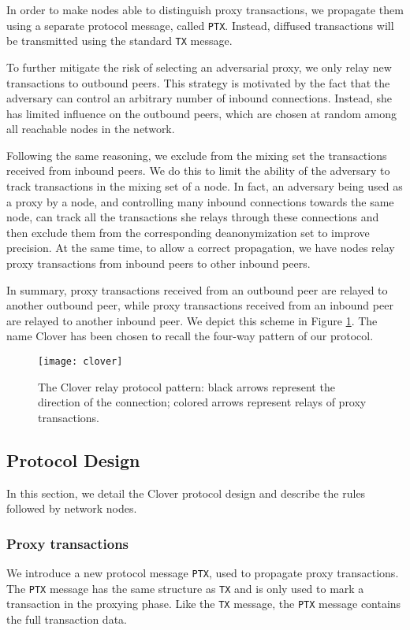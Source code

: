 \documentclass{article}
\begin{document}
	In order to make nodes able to distinguish proxy transactions, we propagate them using a separate protocol message, called \texttt{PTX}.
	Instead, diffused transactions will be transmitted using the standard \texttt{TX} message.
	
	To further mitigate the risk of selecting an adversarial proxy, we only relay new transactions to outbound peers.
	This strategy is motivated by the fact that the adversary can control an arbitrary number of inbound connections.
	Instead, she has limited influence on the outbound peers, which are chosen at random among all reachable nodes in the network.
	
	Following the same reasoning, we exclude from the mixing set the transactions received from inbound peers.
	We do this to limit the ability of the adversary to track transactions in the mixing set of a node.
	In fact, an adversary being used as a proxy by a node, and controlling many inbound connections towards the same node, can track all the transactions she relays through these connections and then exclude them from the corresponding deanonymization set to improve precision.
	At the same time, to allow a correct propagation, we have nodes relay proxy transactions from inbound peers to other inbound peers.
	
	In summary, proxy transactions received from an outbound peer are relayed to another outbound peer, while proxy transactions received from an inbound peer are relayed to another inbound peer.
	We depict this scheme in Figure \ref{fig:clover}.
	The name Clover has been chosen to recall the four-way pattern of our protocol.
	\begin{figure}[tbp]
		\centerline{\texttt{[image: clover]}}
		\caption{The Clover relay protocol pattern: black arrows represent the direction of the connection; colored arrows represent relays of proxy transactions.}
		\label{fig:clover}
	\end{figure}
	
	\subsection{Protocol Design}
	In this section, we detail the Clover protocol design and describe the rules followed by network nodes.
	
	\subsubsection{Proxy transactions}
	We introduce a new protocol message \texttt{PTX}, used to propagate proxy transactions.
	The \texttt{PTX} message has the same structure as \texttt{TX} and is only used to mark a transaction in the proxying phase.
	Like the \texttt{TX} message, the \texttt{PTX} message contains the full transaction data.
	
\end{document}
